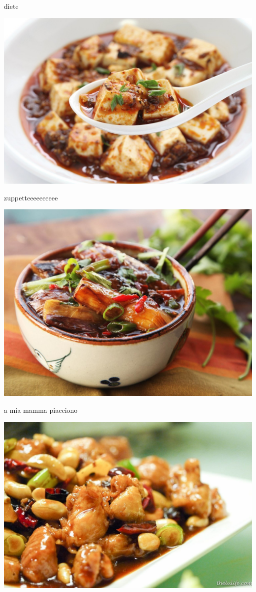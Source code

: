 \documentclass[presentation]{beamer}
\begin{document}
\begin{frame}[label={sec:org98c72c2}]{diete}
\begin{center}
\includegraphics[width=.9\linewidth]{./immagini/tofu.jpg}
\end{center}
\end{frame}
\begin{frame}[label={sec:org9c13f86}]{zuppetteeeeeeeeee}
\begin{center}
\includegraphics[width=.9\linewidth]{./immagini/zuppetta:3.jpg}
\end{center}
\end{frame}
\begin{frame}[label={sec:org1d26eab}]{a mia mamma piacciono}
\begin{center}
\includegraphics[width=.9\linewidth]{./immagini/pollo.jpg}
\end{center}
\end{frame}
\end{document}
